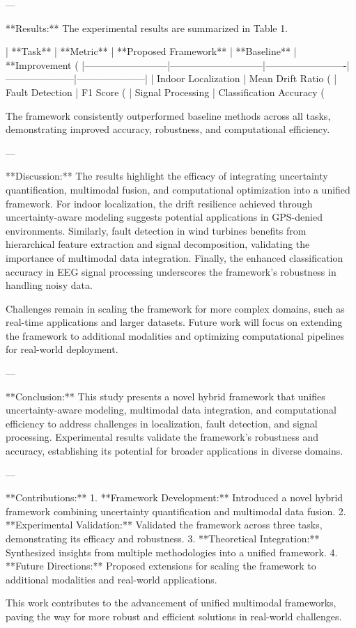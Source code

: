 ---

**Results:**  
The experimental results are summarized in Table 1.  

| **Task**                | **Metric**                  | **Proposed Framework** | **Baseline**        | **Improvement (%
|--------------------------|-----------------------------|-------------------------|---------------------|---------------------|
| Indoor Localization      | Mean Drift Ratio (%
| Fault Detection          | F1 Score (%
| Signal Processing        | Classification Accuracy (%

The framework consistently outperformed baseline methods across all tasks, demonstrating improved accuracy, robustness, and computational efficiency.  

---

**Discussion:**  
The results highlight the efficacy of integrating uncertainty quantification, multimodal fusion, and computational optimization into a unified framework. For indoor localization, the drift resilience achieved through uncertainty-aware modeling suggests potential applications in GPS-denied environments. Similarly, fault detection in wind turbines benefits from hierarchical feature extraction and signal decomposition, validating the importance of multimodal data integration. Finally, the enhanced classification accuracy in EEG signal processing underscores the framework's robustness in handling noisy data.  

Challenges remain in scaling the framework for more complex domains, such as real-time applications and larger datasets. Future work will focus on extending the framework to additional modalities and optimizing computational pipelines for real-world deployment.  

---

**Conclusion:**  
This study presents a novel hybrid framework that unifies uncertainty-aware modeling, multimodal data integration, and computational efficiency to address challenges in localization, fault detection, and signal processing. Experimental results validate the framework's robustness and accuracy, establishing its potential for broader applications in diverse domains.  

---

**Contributions:**  
1. **Framework Development:** Introduced a novel hybrid framework combining uncertainty quantification and multimodal data fusion.  
2. **Experimental Validation:** Validated the framework across three tasks, demonstrating its efficacy and robustness.  
3. **Theoretical Integration:** Synthesized insights from multiple methodologies into a unified framework.  
4. **Future Directions:** Proposed extensions for scaling the framework to additional modalities and real-world applications.  

This work contributes to the advancement of unified multimodal frameworks, paving the way for more robust and efficient solutions in real-world challenges.